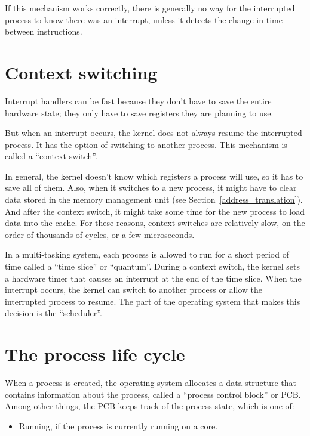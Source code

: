 \documentclass[12pt]{book}
\begin{document}
{\begin{enumerate}
\end{enumerate}

If this mechanism works correctly, there is generally no way for
the interrupted process to know there was an interrupt, unless
it detects the change in time between instructions.


\section{Context switching}

Interrupt handlers can be fast because they don't have to save the
entire hardware state; they only have to save registers they are
planning to use.

But when an interrupt occurs, the kernel does not always resume the
interrupted process.  It has the option of switching to another
process.  This mechanism is called a ``context switch''.

In general, the kernel doesn't know which registers a process will
use, so it has to save all of them.  Also, when it switches to a new
process, it might have to clear data stored in the memory management
unit (see
Section~\ref{address_translation}).  And after the context switch, it
might take some time for the new process to load data into the cache.
For these reasons, context switches are relatively slow, on the order
of thousands of cycles, or a few microseconds.

In a multi-tasking system, each process is allowed to run for a short
period of time called a ``time slice'' or ``quantum''.  During
a context switch, the kernel sets a hardware timer that causes
an interrupt at the end of the time slice.  When the interrupt
occurs, the kernel can switch to another process or allow the
interrupted process to resume.  The part of the operating system
that makes this decision is the ``scheduler''.


\section{The process life cycle}

When a process is created, the operating system allocates a
data structure that contains information about the process, called
a ``process control block'' or PCB.  Among other things, the
PCB keeps track of the process state, which is one of:

\begin{itemize}

\item Running, if the process is currently running on a core.


\end{itemize}}
\end{document}
